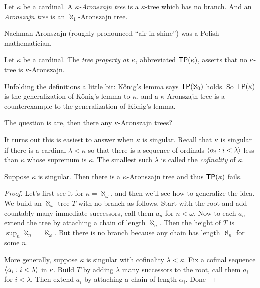 \documentclass[10pt]{amsart}
\newcommand\TP{\axiom{TP}}
\begin{document}
\begin{definition}
Let $\kappa$ be a cardinal. A \emph{$\kappa$-Aronszajn tree} is a $\kappa$-tree which has no branch. And an \emph{Aronszajn tree} is an $\aleph_1$-Aronszajn tree.
\end{definition}

Nachman Aronszajn (roughly pronounced ``air-in-shine'') was a Polish mathematician.

\begin{definition}
Let $\kappa$ be a cardinal. The \emph{tree property at $\kappa$}, abbreviated $\TP(\kappa)$, asserts that no $\kappa$-tree is $\kappa$-Aronszajn.
\end{definition}

Unfolding the definitions a little bit: K\H{o}nig's lemma says $\TP(\aleph_0)$ holds. So $\TP(\kappa)$ is the generalization of K\H{o}nig's lemma to $\kappa$, and a $\kappa$-Aronszajn tree is a counterexample to the generalization of K\H{o}nig's lemma.

The question is are, then there any $\kappa$-Aronszajn trees?

It turns out this is easiest to answer when $\kappa$ is singular. Recall that $\kappa$ is singular if there is a cardinal $\lambda < \kappa$ so that there is a sequence of ordinals ${\left\langle \alpha_i : i < \lambda \right\rangle}$ less than $\kappa$ whose supremum is $\kappa$. The smallest such $\lambda$ is called the \emph{cofinality} of $\kappa$.

\begin{theorem}
Suppose $\kappa$ is singular. Then there is a $\kappa$-Aronszajn tree and thus $\TP(\kappa)$ fails.
\end{theorem}

\begin{proof}
Let's first see it for $\kappa = \aleph_\omega$, and then we'll see how to generalize the idea. We build an $\aleph_\omega$-tree $T$ with no branch as follows. Start with the root and add countably many immediate successors, call them $a_n$ for $n < \omega$. Now to each $a_n$ extend the tree by attaching a chain of length $\aleph_n$. Then the height of $T$ is $\sup_n \aleph_n = \aleph_\omega$. But there is no branch because any chain has length $\aleph_n$ for some $n$.

More generally, suppose $\kappa$ is singular with cofinality $\lambda < \kappa$. Fix a cofinal sequence ${\left\langle \alpha_i : i < \lambda \right\rangle}$ in $\kappa$. Build $T$ by adding $\lambda$ many successors to the root, call them $a_i$ for $i < \lambda$. Then extend $a_i$ by attaching a chain of length $\alpha_i$. Done
\end{proof}
\end{document}
